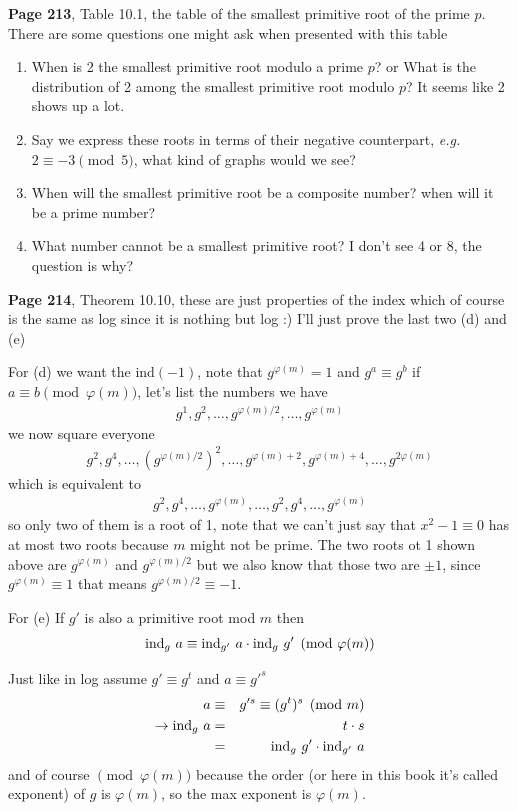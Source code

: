 \documentclass[aps,preprint,preprintnumbers,nofootinbib,showpacs,prd]{revtex4-1}
\newcommand{\eg}{{\it e.g.} }
\newcommand{\nbea}{\begin{eqnarray*}}
\newcommand{\neea}{\end{eqnarray*}}
\begin{document}
{\bf Page 213}, Table 10.1, the table of the smallest primitive root of the prime $p$. There are some questions one might ask when presented with this table
%
\begin{enumerate}
\item When is 2 the smallest primitive root modulo a prime $p$? or What is the distribution of 2 among the smallest primitive root modulo $p$? It seems like 2 shows up a lot.

\item Say we express these roots in terms of their negative counterpart, \eg $2 \equiv -3 \pmod{5}$, what kind of graphs would we see?

\item When will the smallest primitive root be a composite number? when will it be a prime number?

\item What number cannot be a smallest primitive root? I don't see 4 or 8, the question is why?
\end{enumerate}
%

{\bf Page 214}, Theorem 10.10, these are just properties of the index which of course is the same as log since it is nothing but log :) I'll just prove the last two (d) and (e)

For (d) we want the ind$(-1)$, note that $g^{\varphi(m)} = 1$ and $g^a \equiv g^b$ if $a \equiv b \pmod{\varphi(m)}$, let's list the numbers we have
%
\nbea
g^1, g^2, \dots, g^{\varphi(m)/2}, \dots, g^{\varphi(m)}
\neea
%
we now square everyone
%
\nbea
g^2, g^4, \dots, (g^{\varphi(m)/2})^2, \dots, g^{\varphi(m) + 2}, g^{\varphi(m) + 4},\dots,  g^{2\varphi(m)}
\neea
%
which is equivalent to
%
\nbea
g^2, g^4, \dots, g^{\varphi(m)}, \dots, g^2, g^4,\dots, g^{\varphi(m)}
\neea
%
so only two of them is a root of 1, note that we can't just say that $x^2 - 1 \equiv 0$ has at most two roots because $m$ might not be prime. The two roots ot 1 shown above are $g^{\varphi(m)}$ and $g^{\varphi(m)/2}$ but we also know that those two are $\pm 1$, since $g^{\varphi(m)} \equiv 1$ that means $g^{\varphi(m)/2} \equiv -1$.

For (e) If $g'$ is also a primitive root mod $m$ then 
%
\nbea
{\rm ind}_g ~a \equiv {\rm ind}_{g'}~ a \cdot {\rm ind}_g~ g' \pmod{\varphi(m)}
\neea
%

Just like in log assume $g' \equiv g^t$ and $a \equiv g'^s$
%
\nbea
a & \equiv & g'^s \equiv (g^{t})^s \pmod{m} \\
\to {\rm ind}_g~ a & = & t\cdot s \\
& = & {\rm ind}_g~ g' \cdot {\rm ind}_{g'}~ a
\neea
%
and of course $\pmod{\varphi(m)}$ because the order (or here in this book it's called exponent) of $g$ is $\varphi(m)$, so the max exponent is $\varphi(m)$.
\end{document}
